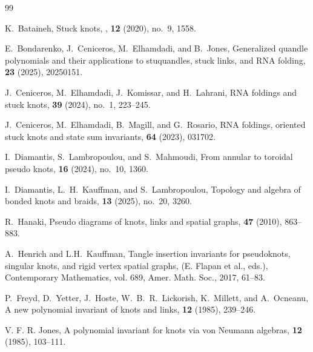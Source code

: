 \documentclass[11pt,a4paper]{article}
\theoremstyle{plain}
\theoremstyle{definition}
\begin{document}
\begin{thebibliography}{99}

K.~Bataineh,
\newblock Stuck knots,
, \textbf{12} (2020), no.~9, 1558.

E.~Bondarenko, J.~Ceniceros, M.~Elhamdadi, and B.~Jones,
\newblock Generalized quandle polynomials and their applications to stuquandles, stuck links, and RNA folding,
 \textbf{23} (2025), 20250151.

J.~Ceniceros, M.~Elhamdadi, J.~Komissar, and H.~Lahrani,
\newblock RNA foldings and stuck knots,
 \textbf{39} (2024), no.~1, 223--245.

J.~Ceniceros, M.~Elhamdadi, B.~Magill, and G.~Rosario,
\newblock RNA foldings, oriented stuck knots and state sum invariants,
 \textbf{64} (2023), 031702.

I.~Diamantis, S.~Lambropoulou, and S.~Mahmoudi,
\newblock From annular to toroidal pseudo knots,
 \textbf{16} (2024), no.~10, 1360.

I.~Diamantis, L.~H.~Kauffman, and S.~Lambropoulou,
\newblock Topology and algebra of bonded knots and braids,
 \textbf{13} (2025), no.~20, 3260.

R.~Hanaki,
\newblock Pseudo diagrams of knots, links and spatial graphs,
 \textbf{47} (2010), 863--883.

A.~Henrich and L.H.~Kauffman,
\newblock Tangle insertion invariants for pseudoknots, singular knots, and rigid vertex spatial graphs,
 (E. Flapan et al., eds.), 
\newblock Contemporary Mathematics, vol. 689, Amer. Math. Soc., 2017, 61--83.

P.~Freyd, D.~Yetter, J.~Hoste, W.~B.~R.~Lickorish, K.~Millett, and A.~Ocneanu,
\newblock A new polynomial invariant of knots and links,
 \textbf{12} (1985), 239--246.

V. F. R. Jones,
\newblock A polynomial invariant for knots via von Neumann algebras,
 \textbf{12} (1985), 103--111.


\end{thebibliography}
\end{document}
